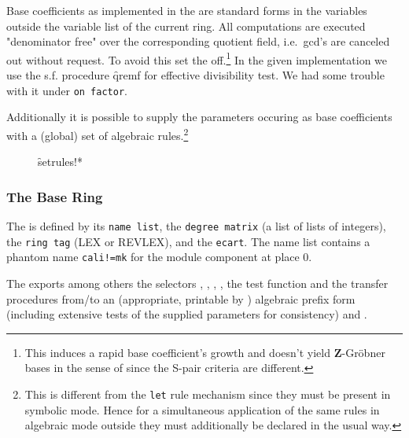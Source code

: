 Base coefficients as implemented in the  are standard
forms in the variables outside the variable list of the current
ring. All computations are executed "denominator free" over the
corresponding quotient field, i.e.\ gcd's are canceled out without
request. To avoid this set the  off.\footnote{This
induces a rapid base coefficient's growth and doesn't yield \textbf{Z}-Gr\"obner
bases in the sense of \cite{Gianni:88} since the S-pair criteria are
different.} In the given implementation we use the s.f. procedure
\f{qremf} for effective divisibility test. We had some trouble with it
under \texttt{on factor}.

Additionally it is possible to supply the
parameters occuring as base coefficients with a (global) set of
algebraic rules.\footnote{This is different from the \texttt{let} rule
mechanism since they must be present in symbolic mode. Hence for a
simultaneous application of the same rules in algebraic mode outside
 they must additionally be declared in the usual way.}
\begin{description}
\item[]
  \hypertarget{procedure:SETRULES!*}{}
  \begin{syntax}
    \f{setrules!*} 
  \end{syntax}
\end{description}

\subsubsection{The Base Ring}

The  is defined by its \texttt{name list}, the
\texttt{degree matrix} (a list of lists of integers), the \texttt{ring tag} (LEX
or REVLEX), and the \texttt{ecart}. The name list contains a phantom
name \texttt{cali!=mk} for the module component at place 0.
\medskip

The  exports among others the selectors
, ,
,
, the test function  and the
transfer procedures from/to an (appropriate, printable by
) algebraic prefix form  (including
extensive tests of the supplied parameters for consistency) and
.

